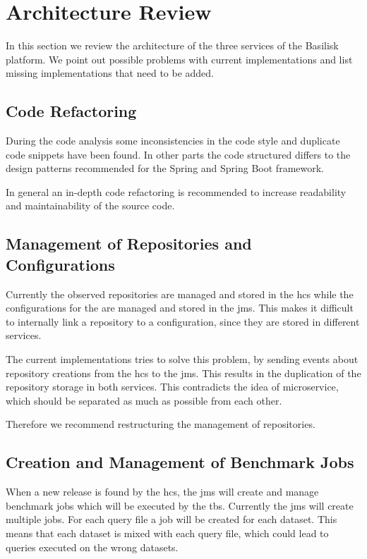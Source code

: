 \section{Architecture Review}
\label{sec:architecture_review}
In this section we review the architecture of the three services of the Basilisk platform.
We point out possible problems with current implementations and list missing implementations that need to be added.


\subsection{Code Refactoring}
\label{sec:code_refactor}
During the code analysis some inconsistencies in the code style and duplicate code snippets have been found.
In other parts the code structured differs to the design patterns recommended for the Spring and Spring Boot framework.

In general an in-depth code refactoring is recommended to increase readability and maintainability of the source code. 


\subsection{Management of Repositories and Configurations}
\label{sec:management_repo_config}
Currently the observed repositories are managed and stored in the \ac{hcs} while the configurations for the \tsp{} are managed and stored in the \ac{jms}.
This makes it difficult to internally link a repository to a \ts{} configuration, since they are stored in different services.

The current implementations tries to solve this problem, by sending events about repository creations from the \ac{hcs} to the \ac{jms}.
This results in the duplication of the repository storage in both services.
This contradicts the idea of microservice, which should be separated as much as possible from each other.

Therefore we recommend restructuring the management of repositories.


\subsection{Creation and Management of Benchmark Jobs}
\label{sec:creation_of_benchmark_jobs}
When a new release is found by the \ac{hcs}, the \acl{jms} will create and manage benchmark jobs which will be executed by the \ac{tbs}.
Currently the \ac{jms} will create multiple jobs.
For each query file a job will be created for each dataset.
This means that each dataset is mixed with each query file, which could lead to queries executed on the wrong datasets.

